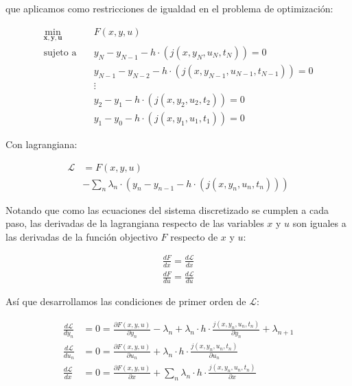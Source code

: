 que aplicamos como restricciones de igualdad en el problema de optimización:

\begin{align}
	\min_{\mathbf{x}, \mathbf{y}, \mathbf{u}} \quad & F(x, y, u)                                                                  \\
	\text{sujeto a} \quad                           & y_N - y_{N-1} - h \cdot (j(x, y_N, u_N, t_N)) = 0   \nonumber               \\
	                                                & y_{N-1} - y_{N-2} - h \cdot (j(x, y_{N-1}, u_{N-1}, t_{N-1})) = 0 \nonumber \\
	                                                & \vdots \nonumber                                                            \\
	                                                & y_{2} - y_{1} - h \cdot (j(x, y_{2}, u_{2}, t_{2})) = 0 \nonumber           \\
	                                                & y_{1} - y_{0} - h \cdot (j(x, y_{1}, u_{1}, t_{1})) = 0
\end{align}

Con lagrangiana:


\begin{align}
	\mathcal{L} & = F(x, y, u) \nonumber                                                                              \\
	            & - \sum_n \lambda_n \cdot (y_n - y_{n-1} - h \cdot (j(x, y_n, u_n, t_n)))  \label{eq:ode_lagrangian}
\end{align}

Notando que como las ecuaciones del sistema discretizado se cumplen a cada
paso, las derivadas de la lagrangiana respecto de las variables $x$ y $u$ son
iguales a las derivadas de la función objectivo $F$ respecto de $x$ y $u$:

\begin{align}
	\frac{dF}{dx} = \frac{d\mathcal{L}}{dx} \nonumber \\
	\frac{dF}{du} = \frac{d\mathcal{L}}{du}
\end{align}


Así que desarrollamos las condiciones de primer orden de $\mathcal{L}$:

\begin{align}
	\frac{d\mathcal{L}}{dy_n} & = 0 = \frac{\partial F(x, y, u)}{\partial y_n} - \lambda_n + \lambda_n \cdot h \cdot \frac{j(x, y_n, u_n, t_n)}{\partial y_n} + \lambda_{n+1} \label{eq:dl_dy_n_ode} \\
	\frac{d\mathcal{L}}{du_n} & = 0 = \frac{\partial F(x, y, u)}{\partial u_n} + \lambda_n \cdot h \cdot \frac{j(x, y_n, u_n, t_n)}{\partial u_n} \label{eq:dl_du_n_ode}                             \\
	\frac{d\mathcal{L}}{dx}   & = 0 = \frac{\partial F(x, y, u)}{\partial x} + \sum_n \lambda_n \cdot h \cdot \frac{j(x, y_n, u_n, t_n)}{\partial x}  \label{eq:dl_dx_ode}
\end{align}

